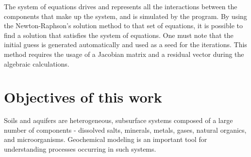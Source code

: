 
The system of equations drives and represents all the interactions between the components that make up the system, and is simulated by the program. By using the Newton-Raphson's solution method to that set of equations, it is possible to find a solution that satisfies the system of equations.  One must note that the initial guess is generated automatically and used as a seed for the iterations. 
This method requires the usage of a Jacobian matrix and a residual vector during the algebraic calculations. 



\section{Objectives of this work}


Soils and aquifers are heterogeneous, subsurface systems composed of a large number of components - dissolved salts, minerals, metals, gases, natural organics, and microorganisms. Geochemical modeling is an important tool for understanding processes occurring in such systems. 


